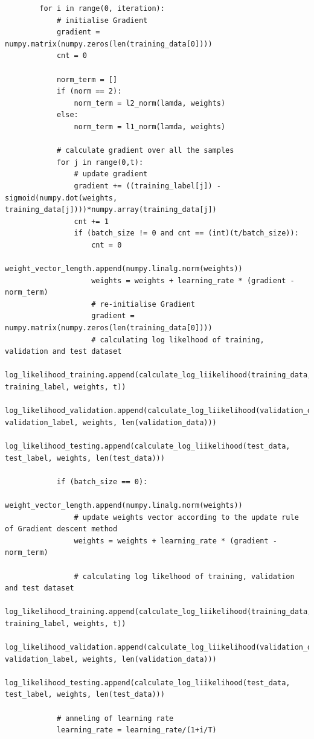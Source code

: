\documentclass{article}
\begin{document}
\begin{lstlisting}
        for i in range(0, iteration):
            # initialise Gradient
            gradient = numpy.matrix(numpy.zeros(len(training_data[0])))
            cnt = 0
        
            norm_term = []
            if (norm == 2):
                norm_term = l2_norm(lamda, weights)
            else:
                norm_term = l1_norm(lamda, weights)
                
            # calculate gradient over all the samples
            for j in range(0,t):
                # update gradient
                gradient += ((training_label[j]) - sigmoid(numpy.dot(weights, training_data[j])))*numpy.array(training_data[j])
                cnt += 1            
                if (batch_size != 0 and cnt == (int)(t/batch_size)):
                    cnt = 0
                    weight_vector_length.append(numpy.linalg.norm(weights))
                    weights = weights + learning_rate * (gradient - norm_term)
                    # re-initialise Gradient
                    gradient = numpy.matrix(numpy.zeros(len(training_data[0])))
                    # calculating log likelhood of training, validation and test dataset
                    log_likelihood_training.append(calculate_log_liikelihood(training_data, training_label, weights, t))
                    log_likelihood_validation.append(calculate_log_liikelihood(validation_data, validation_label, weights, len(validation_data)))
                    log_likelihood_testing.append(calculate_log_liikelihood(test_data, test_label, weights, len(test_data)))
        
            if (batch_size == 0):
                weight_vector_length.append(numpy.linalg.norm(weights))
                # update weights vector according to the update rule of Gradient descent method
                weights = weights + learning_rate * (gradient - norm_term)
                
                # calculating log likelhood of training, validation and test dataset
            log_likelihood_training.append(calculate_log_liikelihood(training_data, training_label, weights, t))
            log_likelihood_validation.append(calculate_log_liikelihood(validation_data, validation_label, weights, len(validation_data)))
            log_likelihood_testing.append(calculate_log_liikelihood(test_data, test_label, weights, len(test_data)))
                
            # anneling of learning rate
            learning_rate = learning_rate/(1+i/T)
        

\end{lstlisting}
\end{document}
